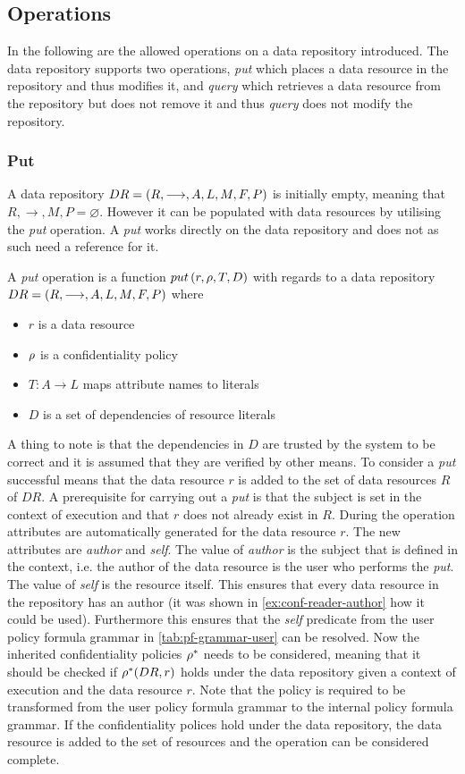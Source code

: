 \subsection{Operations}
In the following are the allowed operations on a data repository introduced. The data repository supports two operations, \emph{put} which places a data resource in the repository and thus modifies it, and \emph{query} which retrieves a data resource from the repository but does not remove it and thus \emph{query} does not modify the repository.

\subsubsection{Put}\label{sec:put}
A data repository $DR= \left( R, \longrightarrow, A, L, M, F, P \right)$ is initially empty, meaning that $R, \longrightarrow, M, P = \varnothing$. However it can be populated with data resources by utilising the \emph{put} operation. A \emph{put} works directly on the data repository and does not as such need a reference for it.
\begin{definition}
A \emph{put} operation is a function $put \left( r, \rho, T, D \right)$ with regards to a data repository $DR= \left( R, \longrightarrow, A, L, M, F, P \right)$ where
\begin{itemize}
  \item $r$ is a data resource
  \item $\rho$ is a confidentiality policy
  \item $T : A \rightarrow L$ maps attribute names to literals
  \item $D$ is a set of dependencies of resource literals
\end{itemize}
\end{definition}
A thing to note is that the dependencies in $D$ are trusted by the system to be correct and it is assumed that they are verified by other means. To consider a \emph{put} successful means that the data resource $r$ is added to the set of data resources $R$ of $DR$. A prerequisite for carrying out a \emph{put} is that the subject is set in the context of execution and that $r$ does not already exist in $R$. During the operation attributes are automatically generated for the data resource $r$. The new attributes are \emph{author} and \emph{self}. The value of \emph{author} is the subject that is defined in the context, i.e. the author of the data resource is the user who performs the \emph{put}. The value of \emph{self} is the resource itself. This ensures that every data resource in the repository has an author (it was shown in \autoref{ex:conf-reader-author} how it could be used). Furthermore this ensures that the \emph{self} predicate from the user policy formula grammar in \autoref{tab:pf-grammar-user} can be resolved. Now the inherited confidentiality policies $\rho^{\ast}$ needs to be considered, meaning that it should be checked if $\rho^{\ast}(DR,r)$ holds under the data repository given a context of execution and the data resource $r$. Note that the policy is required to be transformed from the user policy formula grammar to the internal policy formula grammar. If the confidentiality polices hold under the data repository, the data resource is added to the set of resources and the operation can be considered complete.
